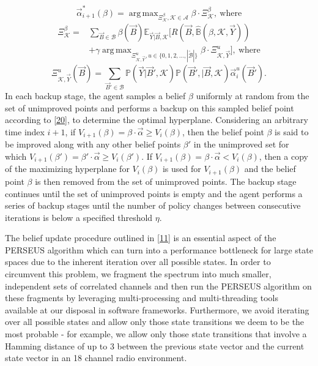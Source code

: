 \documentclass[10pt,twocolumn]{IEEEtran}
\DeclareMathOperator*{\argmax}{arg\,max}
\begin{document}
\begin{equation}
    \vec{\alpha}_{i+1}^{*}(\beta) = \argmax_{\Xi_{\mathcal{K}}^{\beta}, \mathcal{K} \in \mathcal{A}} \beta \cdot \Xi_{\mathcal{K}}^{\beta},\ \text{where}
\end{equation}
\begin{equation}
    \begin{aligned}
        \Xi_{\mathcal{K}}^{\beta} =& \sum_{\vec{B} {\in} \mathcal{B}} \beta(\vec{B}) \mathbb{E}_{\vec{Y}|\vec{B}, \mathcal{K}} \Big[R(\vec{B}, \hat{\mathbb{B}}(\beta, \mathcal{K}, \vec{Y}))\\ &+\gamma \argmax_{\Xi_{\mathcal{K}, \vec{Y}}^{u}, u {\in} \{0, 1, 2, \dots, |\tilde{\mathcal{B}}|\}} \beta \cdot \Xi_{\mathcal{K}, \vec{Y}}^{u}\Big],\ \text{where}
    \end{aligned}
\end{equation}
\begin{equation}
    \Xi_{\mathcal{K}, \vec{Y}}^{u}(\vec{B}) = \sum_{\vec{B}' \in \mathcal{B}} \mathbb{P}(\vec{Y}|\vec{B}', \mathcal{K})\mathbb{P}(\vec{B}',|\vec{B},\mathcal{K})\vec{\alpha}_{i}^{u}(\vec{B}').
\end{equation}
In each backup stage, the agent samples a belief $\beta$ uniformly at random from the set of unimproved points and performs a backup on this sampled belief point according to \eqref{20}, to determine the optimal hyperplane. Considering an arbitrary time index $i{+}1$, if $V_{i+1}(\beta) = \beta \cdot \vec{\alpha} \geq V_{i}(\beta)$, then the belief point $\beta$ is said to be improved along with any other belief points $\beta'$ in the unimproved set for which $V_{i+1}(\beta') = \beta' \cdot \vec{\alpha} \geq V_{i}(\beta')$. If $V_{i+1}(\beta) = \beta \cdot \vec{\alpha} < V_{i}(\beta)$, then a copy of the maximizing hyperplane for $V_i(\beta)$ is used for $V_{i+1}(\beta)$ and the belief point $\beta$ is then removed from the set of unimproved points. The backup stage continues until the set of unimproved points is empty and the agent performs a series of backup stages until the number of policy changes between consecutive iterations is below a specified threshold $\eta$.

The belief update procedure outlined in \eqref{11} is an essential aspect of the PERSEUS algorithm which can turn into a performance bottleneck for large state spaces due to the inherent iteration over all possible states. In order to circumvent this problem, we fragment the spectrum into much smaller, independent sets of correlated channels and then run the PERSEUS algorithm on these fragments by leveraging multi-processing and multi-threading tools available at our disposal in software frameworks. Furthermore, we avoid iterating over all possible states and allow only those state transitions we deem to be the most probable - for example, we allow only those state transitions that involve a Hamming distance of up to 3 between the previous state vector and the current state vector in an 18 channel radio environment.
\end{document}
